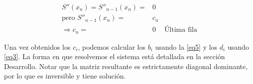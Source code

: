 \begin{align*}
S''(x_n) = S''_{n-1}(x_n) = & 0 \\
\text{pero } S''_{n-1}(x_n) = & c_n \\
\Rightarrow c_n = & 0 & \text{Última fila}
\end{align*}

\bigskip

\par Una vez obtenidos los $c_i$, podemos calcular los $b_i$ usando la \eqref{eq5} y los $d_i$ usando \eqref{eq3}. La forma en que resolvemos el sistema está detallada en la sección Desarrollo. Notar que la matriz resultante es estrictamente diagonal dominante, por lo que es inversible y tiene solución.



